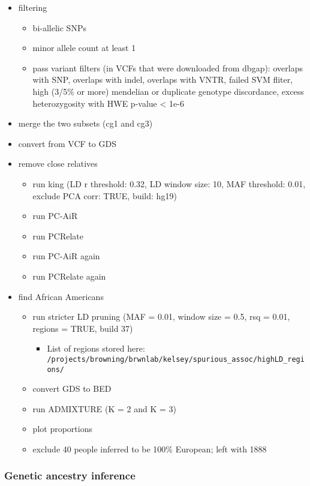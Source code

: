 \documentclass[12pt]{article}
\begin{document}
\begin{itemize}
\item filtering
	\begin{itemize}
	\item bi-allelic SNPs
	\item minor allele count at least 1
	\item pass variant filters (in VCFs that were downloaded from dbgap): overlaps with SNP, overlaps with indel, overlaps with VNTR, failed SVM fliter, high (3/5\% or more) mendelian or duplicate genotype discordance, excess heterozygosity with HWE p-value < 1e-6
	\end{itemize}
\item merge the two subsets (cg1 and cg3)
\item convert from VCF to GDS
\item remove close relatives
	\begin{itemize}
	\item run king (LD r threshold: 0.32, LD window size: 10, MAF threshold: 0.01, exclude PCA corr: TRUE, build: hg19)
	\item run PC-AiR 
	\item run PCRelate 
	\item run PC-AiR again
	\item run PCRelate again
	\end{itemize}
\item find African Americans
	\begin{itemize}
	\item run stricter LD pruning (MAF  = 0.01, window size = 0.5, rsq = 0.01, regions = TRUE, build 37)
		\begin{itemize}
		\item List of regions stored here: \verb"/projects/browning/brwnlab/kelsey/spurious_assoc/highLD_regions/"
		\end{itemize}
	\item convert GDS to BED
	\item run ADMIXTURE (K = 2 and K = 3)
	\item plot proportions
	\item exclude 40 people inferred to be 100\% European; left with 1888
	\end{itemize}
\end{itemize}

\subsubsection{Genetic ancestry inference}
\end{document}
